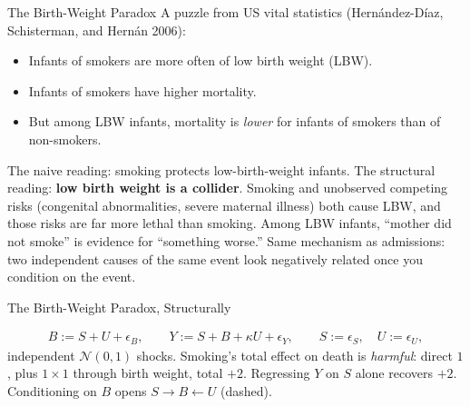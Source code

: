 \documentclass[aspectratio=169,11pt,xcolor=dvipsnames]{beamer}
\newcommand{\srcp}[1]{{\scriptsize\color{gray}(#1)}}
\newcommand{\adv}{\,\raisebox{0.6pt}{\textcolor{accent}{$\bigstar$}}}
\begin{document}
\begin{frame}{The Birth-Weight Paradox}
A puzzle from US vital statistics
\srcp{Hern\'andez-D\'iaz, Schisterman, and Hern\'an 2006}:
\begin{itemize}\itemsep2pt
  \item Infants of smokers are more often of low birth weight (LBW).
  \item Infants of smokers have higher mortality.
  \item \alert{But among LBW infants, mortality is \emph{lower} for infants
        of smokers than of non-smokers.}
\end{itemize}
\vskip3pt
The naive reading: smoking protects low-birth-weight infants.
\vskip3pt
The structural reading: \textbf{low birth weight is a collider}. Smoking and
unobserved competing risks (congenital abnormalities, severe maternal illness)
both cause LBW, and those risks are far more lethal than smoking. Among LBW
infants, ``mother did not smoke'' is evidence for ``something worse.''
\vskip3pt
Same mechanism as admissions: two independent causes of the same event look
negatively related once you condition on the event.
\end{frame}

\begin{frame}{The Birth-Weight Paradox, Structurally\adv}
\begin{center}
\end{center}
\begin{align*}
  B := S + U + \epsilon_B, \qquad
  Y := S + B + \kappa U + \epsilon_Y, \qquad
  S := \epsilon_S, \quad U := \epsilon_U,
\end{align*}
independent $\mathcal N(0,1)$ shocks. Smoking's total effect on death is
\emph{harmful}: direct $1$, plus $1 \times 1$ through birth weight, total
$+2$. Regressing $Y$ on $S$ alone recovers $+2$. Conditioning on $B$ opens
$S \to B \leftarrow U$ (dashed).
\end{frame}
\end{document}
